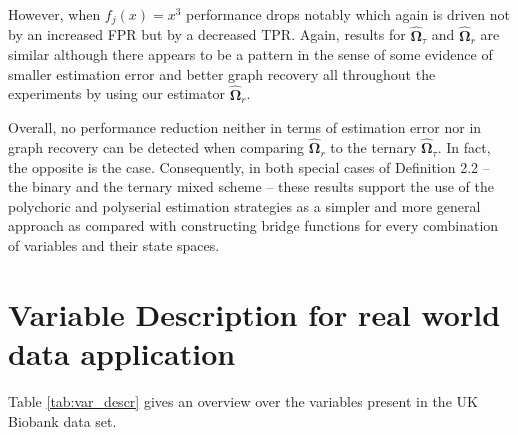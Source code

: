 
However, when $f_j(x)=x^3$ performance drops notably which again is driven not by an increased FPR but by a decreased TPR.
Again, results for $\hat{\boldsymbol\Omega}_\tau$ and $\hat{\boldsymbol\Omega}_r$ are similar although there appears to be a pattern in the sense of some evidence of smaller estimation error and better graph recovery all throughout the experiments by using our estimator $\hat{\boldsymbol\Omega}_r$.

Overall, no performance reduction neither in terms of estimation error nor in graph recovery can be detected when comparing $\hat{\boldsymbol\Omega}_r$ to the ternary $\hat{\boldsymbol\Omega}_\tau$. In fact, the opposite is the case. Consequently, in both special cases of Definition 2.2 %
-- the binary and the ternary mixed scheme --
these results support the use of the polychoric and polyserial estimation strategies as a simpler and more general approach as compared with constructing bridge functions for every combination of variables and their state spaces.




\section{Variable Description for real world data application}

Table \ref{tab:var_descr} gives an overview over the variables present in the UK Biobank data set.



